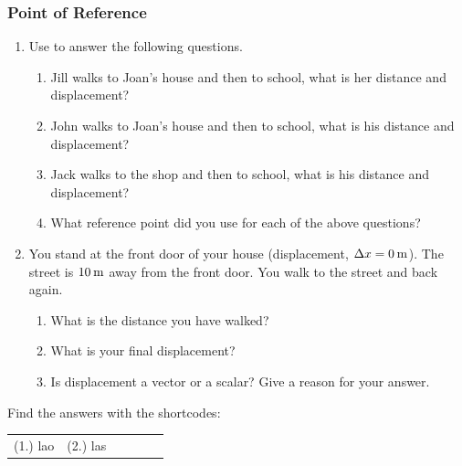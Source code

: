            \subsubsection{  Point of Reference }
            \nopagebreak
        \label{m38788*id64042}\begin{enumerate}[noitemsep, label=\textbf{\arabic*}. ] 
            \label{m38788*uid20}\item Use  to answer the following questions.
\label{m38788*id64060}\begin{enumerate}[noitemsep, label=\textbf{\alph*}. ] 
            \label{m38788*uid21}\item Jill walks to Joan's house and then to school, what is her distance and displacement?
\label{m38788*uid22}\item John walks to Joan's house and then to school, what is his distance and displacement?
\label{m38788*uid23}\item Jack walks to the shop and then to school, what is his distance and displacement?
\label{m38788*uid24}\item What reference point did you use for each of the above questions?
\end{enumerate}
                \label{m38788*uid25}\item You stand at the front door of your house (displacement, $\Delta x=0\phantom{\rule{2pt}{0ex}}\mathrm{m}$). The street is $10\phantom{\rule{2pt}{0ex}}\mathrm{m}$ away from the front door. You walk to the street and back again.
\label{m38788*id64141}\begin{enumerate}[noitemsep, label=\textbf{\alph*}. ] 
            \label{m38788*uid26}\item What is the distance you have walked?
\label{m38788*uid27}\item What is your final displacement?
\label{m38788*uid28}\item Is displacement a vector or a scalar? Give a reason for your answer.
\end{enumerate}
                \end{enumerate}
  \label{m38788**end}
\par {} Find the answers with the shortcodes:
 \par \begin{tabular}[h]{cccccc}
 (1.) lao  &  (2.) las  & \end{tabular}
